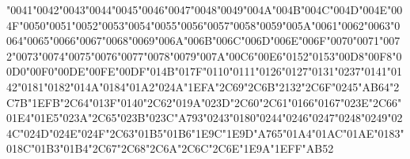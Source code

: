 {\LibertinusSerifPatch
	\char"0041\gs \char"0042\gs \char"0043\gs \char"0044\gs \char"0045\gs \char"0046\gs \char"0047\gs \char"0048\gs \char"0049\gs \char"004A\gs \char"004B\gs \char"004C\gs \char"004D\gs \char"004E\gs \char"004F\gs \char"0050\gs \char"0051\gs \char"0052\gs \char"0053\gs \char"0054\gs \char"0055\gs \char"0056\gs \char"0057\gs \char"0058\gs \char"0059\gs \char"005A\gs \char"0061\gs \char"0062\gs \char"0063\gs \char"0064\gs \char"0065\gs \char"0066\gs \char"0067\gs \char"0068\gs \char"0069\gs \char"006A\gs \char"006B\gs \char"006C\gs \char"006D\gs \char"006E\gs \char"006F\gs \char"0070\gs \char"0071\gs \char"0072\gs \char"0073\gs \char"0074\gs \char"0075\gs \char"0076\gs \char"0077\gs \char"0078\gs \char"0079\gs \char"007A\gs \char"00C6\gs \char"00E6\gs \char"0152\gs \char"0153\gs \char"00D8\gs \char"00F8\gs \char"00D0\gs \char"00F0\gs \char"00DE\gs \char"00FE\gs \char"00DF\gs \char"014B\gs \char"017F\gs \char"0110\gs \char"0111\gs \char"0126\gs \char"0127\gs \char"0131\gs \char"0237\gs \char"0141\gs \char"0142\gs \char"0181\gs \char"0182\gs \char"014A\gs \char"0184\gs \char"01A2\gs \char"024A\gs \char"1EFA\gs \char"2C69\gs \char"2C6B\gs \char"2132\gs \char"2C6F\gs \char"0245\gs \char"AB64\gs \char"2C7B\gs \char"1EFB\gs \char"2C64\gs \char"013F\gs \char"0140\gs \char"2C62\gs \char"019A\gs \char"023D\gs \char"2C60\gs \char"2C61\gs \char"0166\gs \char"0167\gs \char"023E\gs \char"2C66\gs \char"01E4\gs \char"01E5\gs \char"023A\gs \char"2C65\gs \char"023B\gs \char"023C\gs \char"A793\gs \char"0243\gs \char"0180\gs \char"0244\gs \char"0246\gs \char"0247\gs \char"0248\gs \char"0249\gs \char"024C\gs \char"024D\gs \char"024E\gs \char"024F\gs \char"2C63\gs \char"01B5\gs \char"01B6\gs \char"1E9C\gs \char"1E9D\gs \char"A765\gs \char"01A4\gs \char"01AC\gs \char"01AE\gs \char"0183\gs \char"018C\gs \char"01B3\gs \char"01B4\gs \char"2C67\gs \char"2C68\gs \char"2C6A\gs \char"2C6C\gs \char"2C6E\gs \char"1E9A\gs \char"1EFF\gs \char"AB52\gs
}

